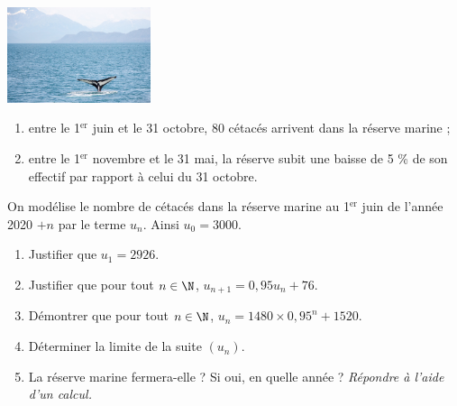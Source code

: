 \documentclass[a4paper,11pt,exos]{nsi} %
\begin{document}
\exo{}
{\includegraphics[width=4.2cm]{whale-4424846_1280.jpg}}
\begin{enumerate}[label=\textbullet]
    \item entre le 1$^{\text{er}}$ juin et le 31 octobre, 80 cétacés arrivent dans la réserve marine ;
    \item entre le 1$^{\text{er}}$ novembre et le 31 mai, la réserve subit une baisse de 5 \% de son effectif par rapport à celui du 31 octobre.
\end{enumerate}
On modélise le nombre de cétacés dans la réserve marine au 1$^{\text{er}}$ juin de l'année 2020 $+n$ par le terme $u_n$. Ainsi $u_0=3000$.
\begin{enumerate}
    \item Justifier que $u_1=2926$.
    \item Justifier que pour tout $n\in\N$, $u_{n+1}=0,95u_n+76$.
    \item Démontrer que pour tout $n\in\N$, $u_{n}=1480\times 0,95^n+1520$.
    \item Déterminer la limite de la suite $(u_n)$.
    \item La réserve marine fermera-elle ? Si oui, en quelle année ? \textit{Répondre à l'aide d'un calcul.}
\end{enumerate}
\end{document}
